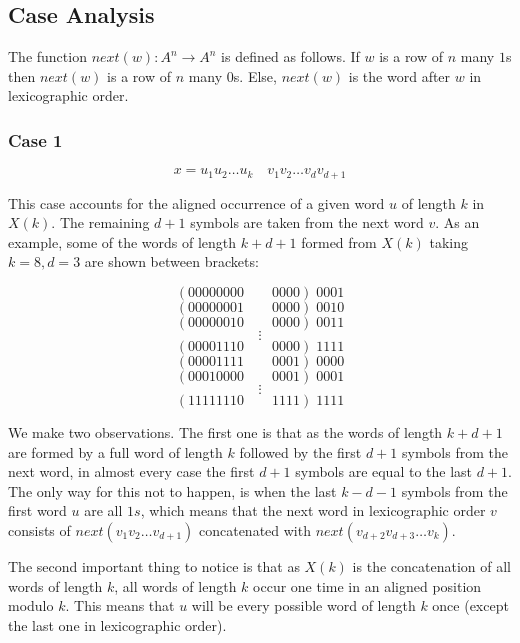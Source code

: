 \documentclass[11pt,a4paper]{tesis}
\newtheorem{definition}{Definition}[]
\newcommand{\note}[1]{\textbf{\color{red}{#1}}}
\begin{document}
\subsection{Case Analysis}


    The function  $next(w):A^n \rightarrow A^n $ is defined as follows. If $w$ is a row of $n$ many $1$s then  $next(w)$ is a row of $n$ many $0$s.
Else, $next(w)$ is the word  after $w$ in lexicographic order.

\subsubsection{Case 1}
$$x = u_1 u_2 \dots u_k \quad v_1 v_2 \dots v_{d} v_{d + 1}$$

This case accounts for the aligned occurrence of a given word $u$ of length $k$ in $X(k)$. The remaining $d + 1$ symbols are taken from the next word $v$.
As an example, some of the words of length $k + d + 1$ formed from $X(k)$ taking $k = 8, d = 3$ are shown between brackets:

$$( 00000000 \qquad 0000 ) \; 0001$$
$$( 00000001 \qquad 0000 ) \; 0010$$
$$( 00000010 \qquad 0000 ) \; 0011$$
$$\vdots$$
$$( 00001110 \qquad 0000 ) \; 1111$$
$$( 00001111 \qquad 0001 ) \; 0000$$
$$( 00010000 \qquad 0001 ) \; 0001$$
$$\vdots$$
$$( 11111110 \qquad 1111 ) \; 1111$$

We make two observations. The first one is that as the words of length $k + d + 1$ are formed by a full word of length $k$ followed by the first $d + 1$ symbols from the next word, in almost every case the first $d + 1$ symbols are equal to the last $d + 1$.
The only way for this not to happen, is when the last $k - d - 1$ symbols from the first word $u$ are all $1s$, which means that the next word in lexicographic order $v$ consists of $next(v_1 v_2 \dots v_{d + 1})$ concatenated with $next(v_{d + 2} v_{d + 3} \dots v_{k})$.

The second important thing to notice is that as $X(k)$ is the concatenation of all words of length $k$, 
all words of length $k$ occur one time in an aligned position modulo $k$. This means that $u$ will be every possible word of length $k$ once (except the last one in lexicographic order).
\end{document}
